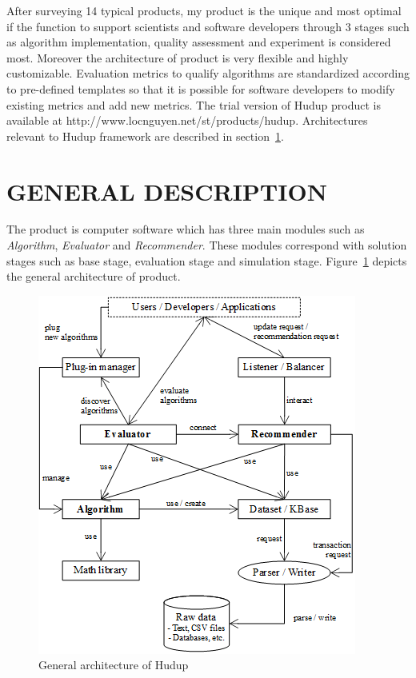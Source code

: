 \documentclass[a4paper,twoside]{article}
\begin{document}
After surveying 14 typical products, my product is the unique and most optimal if the function to support scientists and software developers through 3 stages such as algorithm implementation, quality assessment and experiment is considered most. Moreover the architecture of product is very flexible and highly customizable. Evaluation metrics to qualify algorithms are standardized according to pre-defined templates so that it is possible for software developers to modify existing metrics and add new metrics. The trial version of Hudup product is available at http://www.locnguyen.net/st/products/hudup. Architectures relevant to Hudup framework are described in section~\ref{sec:description}.

\section{\uppercase{General Description}}
\label{sec:description}
The product is computer software which has three main modules such as \textit{Algorithm}, \textit{Evaluator} and \textit{Recommender}. These modules correspond with solution stages such as base stage, evaluation stage and simulation stage. Figure~\ref{figure:general-architecture} depicts the general architecture of product.
\begin{figure}
\centering
\includegraphics{CompoundGeneralArchitecture.png}
\caption{General architecture of Hudup}
\label{figure:general-architecture}
\end{figure}
\end{document}
